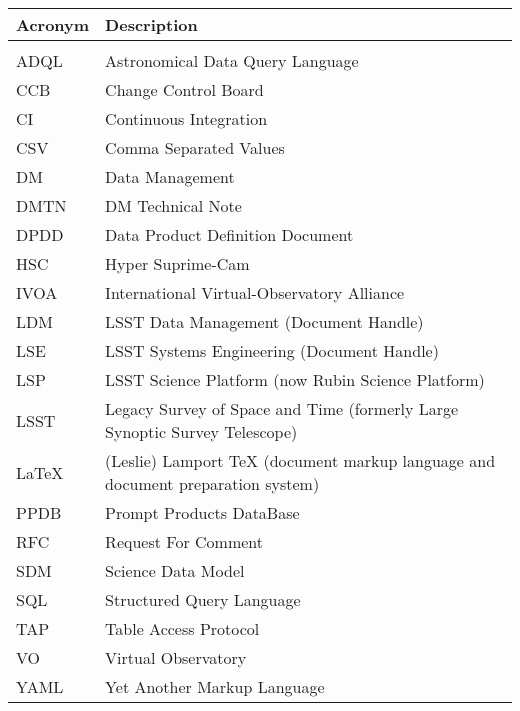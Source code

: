 \addtocounter{table}{-1}
\begin{longtable}{p{}p{}}\hline
\textbf{Acronym} & \textbf{Description}  \\\hline

 &  \\\hline
ADQL & Astronomical Data Query Language \\\hline
CCB & Change Control Board \\\hline
CI & Continuous Integration \\\hline
CSV & Comma Separated Values \\\hline
DM & Data Management \\\hline
DMTN & DM Technical Note \\\hline
DPDD & Data Product Definition Document \\\hline
HSC & Hyper Suprime-Cam \\\hline
IVOA & International Virtual-Observatory Alliance \\\hline
LDM & LSST Data Management (Document Handle) \\\hline
LSE & LSST Systems Engineering (Document Handle) \\\hline
LSP & LSST Science Platform (now Rubin Science Platform) \\\hline
LSST & Legacy Survey of Space and Time (formerly Large Synoptic Survey Telescope) \\\hline
LaTeX & (Leslie) Lamport TeX (document markup language and document preparation system) \\\hline
PPDB & Prompt Products DataBase \\\hline
RFC & Request For Comment \\\hline
SDM & Science Data Model \\\hline
SQL & Structured Query Language \\\hline
TAP & Table Access Protocol \\\hline
VO & Virtual Observatory \\\hline
YAML & Yet Another Markup Language \\\hline
\end{longtable}

